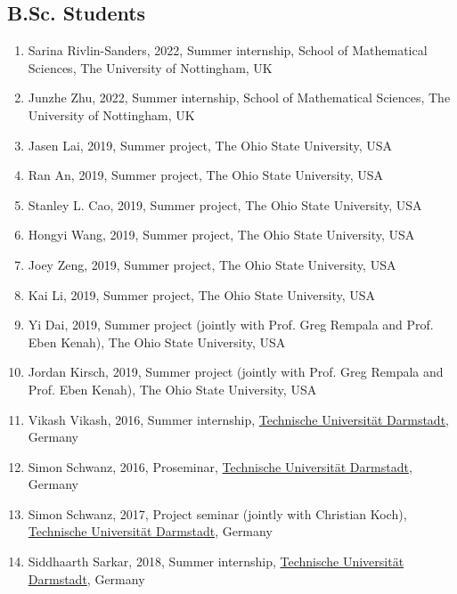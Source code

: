 \documentclass[11pt,a4paper,sans]{moderncv}        %
\begin{document}
\subsection{B.Sc. Students}
\begin{enumerate}
	\item Sarina Rivlin-Sanders, 2022, Summer internship, School of Mathematical Sciences, The University of Nottingham, UK
	\item Junzhe Zhu, 2022, Summer internship, School of Mathematical Sciences, The University of Nottingham, UK
	\item Jasen Lai, 2019, Summer project, The Ohio State University, USA 
	\item Ran An, 2019, Summer project, The Ohio State University, USA
	\item Stanley L. Cao, 2019, Summer project, The Ohio State University, USA
	\item Hongyi Wang, 2019, Summer project, The Ohio State University, USA
	\item Joey Zeng, 2019, Summer project, The Ohio State University, USA
	\item Kai Li, 2019, Summer project, The Ohio State University, USA
	\item Yi Dai, 2019, Summer project (jointly with Prof. Greg Rempala and Prof. Eben Kenah), The Ohio State University, USA 
	\item Jordan Kirsch, 2019, Summer project (jointly with Prof. Greg Rempala and Prof. Eben Kenah), The Ohio State University, USA
	\item Vikash Vikash, 2016, Summer internship, \href{http://www.tu-darmstadt.de/index.en.jsp}{Technische Universit\"{a}t Darmstadt}, Germany%
	\item Simon Schwanz, 2016, Proseminar, \href{http://www.tu-darmstadt.de/index.en.jsp}{Technische Universit\"{a}t Darmstadt}, Germany
	\item Simon Schwanz, 2017, Project seminar (jointly with Christian Koch), \href{http://www.tu-darmstadt.de/index.en.jsp}{Technische Universit\"{a}t Darmstadt}, Germany
	\item Siddhaarth Sarkar, 2018, Summer internship, \href{http://www.tu-darmstadt.de/index.en.jsp}{Technische Universit\"{a}t Darmstadt}, Germany
\end{enumerate}
\end{document}
